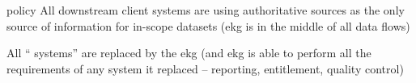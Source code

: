 \ekgmmscoringlevelFour

\begin{scoring}

    \item [policy] All downstream client systems are using authoritative sources as the only source of information
          for in-scope datasets (\gls{ekg} is in the middle of all data flows)
    \item All “ systems” are replaced by the \gls{ekg}
          (and \gls{ekg} is able to perform all the requirements of any system it replaced --
          reporting, entitlement, quality control)

\end{scoring}
